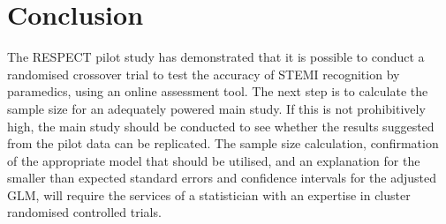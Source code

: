 \chapter{Conclusion}
\label{conclusion}


The RESPECT pilot study has demonstrated that it is possible to conduct a randomised crossover trial to test the accuracy of STEMI recognition by paramedics, using an online assessment tool. The next step is to calculate the sample size for an adequately powered main study. If this is not prohibitively high, the main study should be conducted to see whether the results suggested from the pilot data can be replicated. The sample size calculation, confirmation of the appropriate model that should be utilised, and an explanation for the smaller than expected standard errors and confidence intervals for the adjusted GLM, will require the services of a statistician with an expertise in cluster randomised controlled trials.
